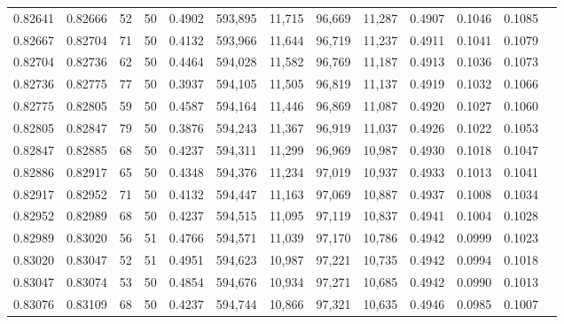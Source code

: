 \begin{tabular}{rrrrrrrrrrrrr}
0.82641 & 0.82666 &    52 &  50 &                                     0.4902 & 593,895 &  11,715 &  96,669 &  11,287 & 0.4907 & 0.1046 & 0.1085 \\
0.82667 & 0.82704 &    71 &  50 &                                     0.4132 & 593,966 &  11,644 &  96,719 &  11,237 & 0.4911 & 0.1041 & 0.1079 \\
0.82704 & 0.82736 &    62 &  50 &                                     0.4464 & 594,028 &  11,582 &  96,769 &  11,187 & 0.4913 & 0.1036 & 0.1073 \\
0.82736 & 0.82775 &    77 &  50 &                                     0.3937 & 594,105 &  11,505 &  96,819 &  11,137 & 0.4919 & 0.1032 & 0.1066 \\
0.82775 & 0.82805 &    59 &  50 &                                     0.4587 & 594,164 &  11,446 &  96,869 &  11,087 & 0.4920 & 0.1027 & 0.1060 \\
0.82805 & 0.82847 &    79 &  50 &                                     0.3876 & 594,243 &  11,367 &  96,919 &  11,037 & 0.4926 & 0.1022 & 0.1053 \\
0.82847 & 0.82885 &    68 &  50 &                                     0.4237 & 594,311 &  11,299 &  96,969 &  10,987 & 0.4930 & 0.1018 & 0.1047 \\
0.82886 & 0.82917 &    65 &  50 &                                     0.4348 & 594,376 &  11,234 &  97,019 &  10,937 & 0.4933 & 0.1013 & 0.1041 \\
0.82917 & 0.82952 &    71 &  50 &                                     0.4132 & 594,447 &  11,163 &  97,069 &  10,887 & 0.4937 & 0.1008 & 0.1034 \\
0.82952 & 0.82989 &    68 &  50 &                                     0.4237 & 594,515 &  11,095 &  97,119 &  10,837 & 0.4941 & 0.1004 & 0.1028 \\
0.82989 & 0.83020 &    56 &  51 &                                     0.4766 & 594,571 &  11,039 &  97,170 &  10,786 & 0.4942 & 0.0999 & 0.1023 \\
0.83020 & 0.83047 &    52 &  51 &                                     0.4951 & 594,623 &  10,987 &  97,221 &  10,735 & 0.4942 & 0.0994 & 0.1018 \\
0.83047 & 0.83074 &    53 &  50 &                                     0.4854 & 594,676 &  10,934 &  97,271 &  10,685 & 0.4942 & 0.0990 & 0.1013 \\
0.83076 & 0.83109 &    68 &  50 &                                     0.4237 & 594,744 &  10,866 &  97,321 &  10,635 & 0.4946 & 0.0985 & 0.1007 \\

\end{tabular}
